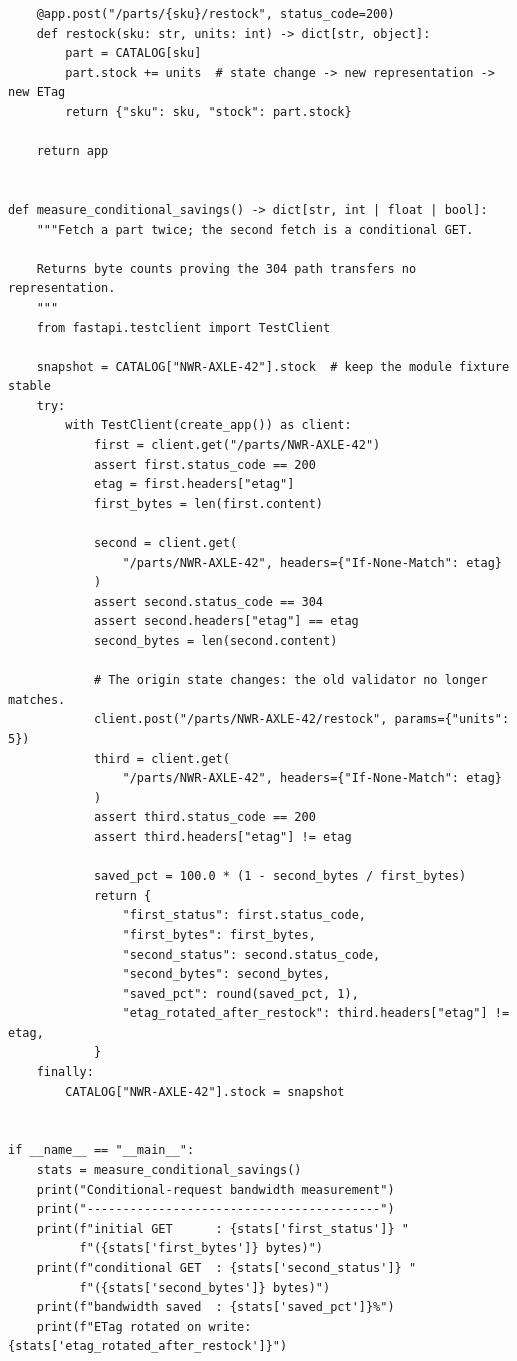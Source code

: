 \begin{verbatim}
    @app.post("/parts/{sku}/restock", status_code=200)
    def restock(sku: str, units: int) -> dict[str, object]:
        part = CATALOG[sku]
        part.stock += units  # state change -> new representation -> new ETag
        return {"sku": sku, "stock": part.stock}

    return app


def measure_conditional_savings() -> dict[str, int | float | bool]:
    """Fetch a part twice; the second fetch is a conditional GET.

    Returns byte counts proving the 304 path transfers no representation.
    """
    from fastapi.testclient import TestClient

    snapshot = CATALOG["NWR-AXLE-42"].stock  # keep the module fixture stable
    try:
        with TestClient(create_app()) as client:
            first = client.get("/parts/NWR-AXLE-42")
            assert first.status_code == 200
            etag = first.headers["etag"]
            first_bytes = len(first.content)

            second = client.get(
                "/parts/NWR-AXLE-42", headers={"If-None-Match": etag}
            )
            assert second.status_code == 304
            assert second.headers["etag"] == etag
            second_bytes = len(second.content)

            # The origin state changes: the old validator no longer matches.
            client.post("/parts/NWR-AXLE-42/restock", params={"units": 5})
            third = client.get(
                "/parts/NWR-AXLE-42", headers={"If-None-Match": etag}
            )
            assert third.status_code == 200
            assert third.headers["etag"] != etag

            saved_pct = 100.0 * (1 - second_bytes / first_bytes)
            return {
                "first_status": first.status_code,
                "first_bytes": first_bytes,
                "second_status": second.status_code,
                "second_bytes": second_bytes,
                "saved_pct": round(saved_pct, 1),
                "etag_rotated_after_restock": third.headers["etag"] != etag,
            }
    finally:
        CATALOG["NWR-AXLE-42"].stock = snapshot


if __name__ == "__main__":
    stats = measure_conditional_savings()
    print("Conditional-request bandwidth measurement")
    print("-----------------------------------------")
    print(f"initial GET      : {stats['first_status']} "
          f"({stats['first_bytes']} bytes)")
    print(f"conditional GET  : {stats['second_status']} "
          f"({stats['second_bytes']} bytes)")
    print(f"bandwidth saved  : {stats['saved_pct']}%")
    print(f"ETag rotated on write: {stats['etag_rotated_after_restock']}")
\end{verbatim}

